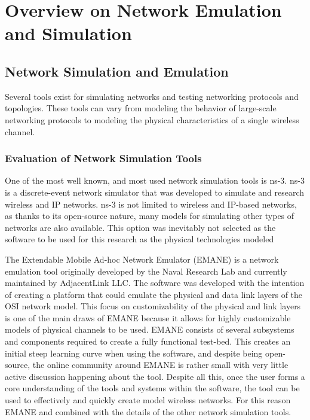 \chapter{Overview on Network Emulation and Simulation}
\label{chapter2}

\section{Network Simulation and Emulation}
Several tools exist for simulating networks and testing networking protocols and topologies.
These tools can vary from modeling the behavior of large-scale networking protocols to modeling the physical characteristics of a single wireless channel.

\subsection{Evaluation of Network Simulation Tools}
One of the most well known, and most used network simulation tools is ns-3.
ns-3 is a discrete-event network simulator that was developed to simulate and research wireless and IP networks.
ns-3 is not limited to wireless and IP-based networks, as thanks to its open-source nature, many models for simulating other types of networks are also available.
This option was inevitably not selected as the software to be used for this research as the physical technologies modeled 

The Extendable Mobile Ad-hoc Network Emulator (EMANE) is a network emulation tool originally developed by the Naval Research Lab and currently maintained by AdjacentLink LLC.
The software was developed with the intention of creating a platform that could emulate the physical and data link layers of the OSI network model.
This focus on customizability of the physical and link layers is one of the main draws of EMANE because it allows for highly customizable models of physical channels to be used. 
EMANE consists of several subsystems and components required to create a fully functional test-bed.
This creates an initial steep learning curve when using the software, and despite being open-source, the online community around EMANE is rather small with very little active discussion happening about the tool.
Despite all this, once the user forms a core understanding of the tools and systems within the software, the tool can be used to effectively and quickly create model wireless networks.
For this reason EMANE and combined with the details of the other network simulation tools.

